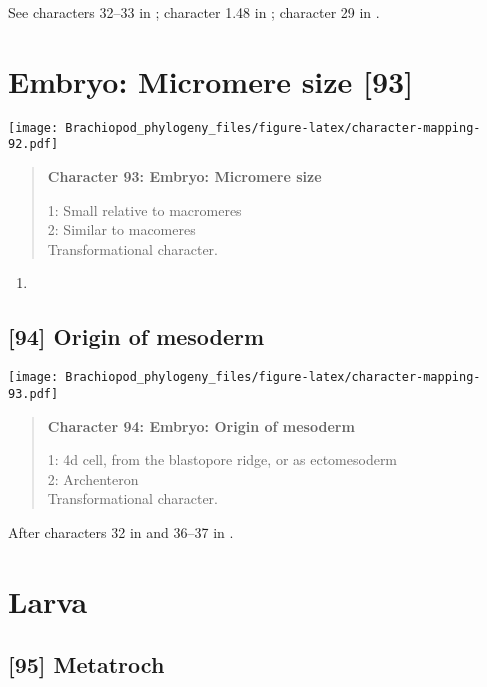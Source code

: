 \documentclass[openany]{book}
\theoremstyle{definition}
\theoremstyle{definition}
\theoremstyle{definition}
\theoremstyle{remark}
\begin{document}
See characters 32--33 in \citet{Haszprunar1996}; character 1.48 in
\citet{SPS1996}; character 29 in \citet{Glenner2004}.

\section{Embryo: Micromere size
{[}93{]}}\label{embryo-micromere-size-93}

\texttt{[image: Brachiopod\_phylogeny\_files/figure-latex/character-mapping-92.pdf]}

\begin{quote}
\textbf{Character 93: Embryo: Micromere size}

1: Small relative to macromeres\\
2: Similar to macomeres\\
Transformational character.
\end{quote}

\begin{enumerate}
\def\labelenumi{\arabic{enumi}.}
\item
\end{enumerate}

\subsection*{{[}94{]} Origin of mesoderm}\label{origin-of-mesoderm}

\texttt{[image: Brachiopod\_phylogeny\_files/figure-latex/character-mapping-93.pdf]}

\begin{quote}
\textbf{Character 94: Embryo: Origin of mesoderm}

1: 4d cell, from the blastopore ridge, or as ectomesoderm\\
2: Archenteron\\
Transformational character.
\end{quote}

After characters 32 in \citet{Grobe2007} and 36--37 in
\citet{Glenner2004}.

\section{Larva}\label{larva}

\subsection*{{[}95{]} Metatroch}\label{metatroch}
\end{document}
